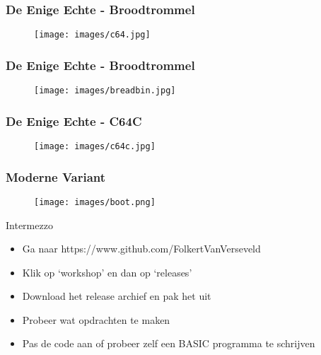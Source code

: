 \documentclass[aspectratio=43]{uva-inf-presentation}
\begin{document}
\begin{frame}
\frametitle{De Enige Echte - Broodtrommel}

\begin{figure}
\texttt{[image: images/c64.jpg]}
\end{figure}

\end{frame}


\begin{frame}
\frametitle{De Enige Echte - Broodtrommel}

\begin{figure}
\texttt{[image: images/breadbin.jpg]}
\end{figure}

\end{frame}


\begin{frame}
\frametitle{De Enige Echte - C64C}

\begin{figure}
\texttt{[image: images/c64c.jpg]}
\end{figure}

\end{frame}


\begin{frame}
\frametitle{Moderne Variant}

\begin{figure}
\texttt{[image: images/boot.png]}
\end{figure}

\end{frame}


\begin{frame}{Intermezzo}

\begin{itemize}
\item Ga naar https://www.github.com/FolkertVanVerseveld
\item Klik op `workshop' en dan op `releases'
\item Download het release archief en pak het uit
\item Probeer wat opdrachten te maken
\item Pas de code aan of probeer zelf een BASIC programma te schrijven
\end{itemize}

\end{frame}
\end{document}
